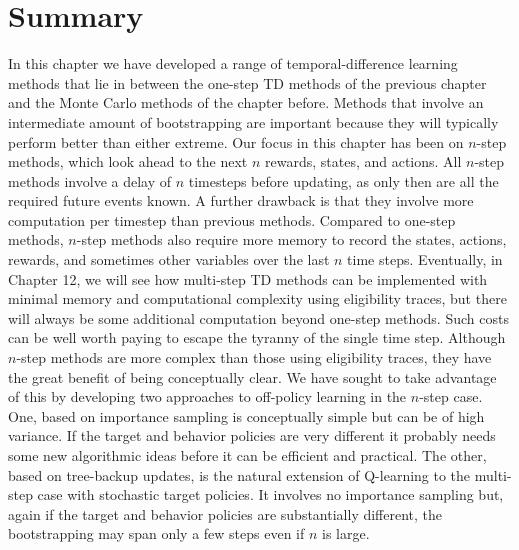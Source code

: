 \section{Summary}
\label{sec:nsb-summary}
In this chapter we have developed a range of temporal-difference learning methods that lie
in between the one-step TD methods of the previous chapter and the Monte Carlo methods
of the chapter before.
Methods that involve an intermediate amount of bootstrapping are important because they will
typically perform better than either extreme.
Our focus in this chapter has been on $n$-step methods, which look ahead to the next $n$ rewards,
states, and actions.
All $n$-step methods involve a delay of $n$ timesteps before updating, as only then are all the
required future events known.
A further drawback is that they involve more computation per timestep than previous methods.
Compared to one-step methods, $n$-step methods also require more memory to record the states,
actions, rewards, and sometimes other variables over the last $n$ time steps.
Eventually, in Chapter 12, we will see how multi-step TD methods can be implemented with
minimal memory and computational complexity using eligibility traces, but there will always be some
additional computation beyond one-step methods.
Such costs can be well worth paying to escape the tyranny of the single time step.
Although $n$-step methods are more complex than those using eligibility traces, they have
the great benefit of being conceptually clear.
We have sought to take advantage of this by developing two approaches to off-policy learning in
the $n$-step case.
One, based on importance sampling is conceptually simple but can be of high variance.
If the target and behavior policies are very different it probably needs some new algorithmic
ideas before it can be efficient and practical.
The other, based on tree-backup updates, is the natural extension of Q-learning to the multi-step
case with stochastic target policies.
It involves no importance sampling but, again if the target and behavior policies are substantially
different, the bootstrapping may span only a few steps even if $n$ is large.
